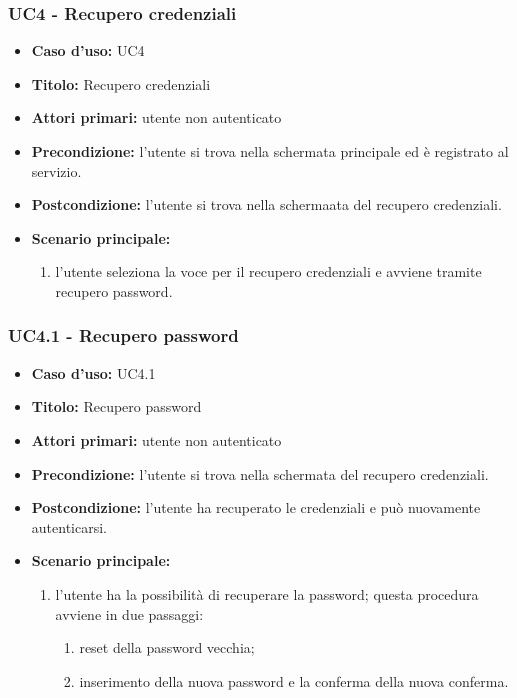 \documentclass[casi-duso]{subfiles}
\begin{document}
\subsubsection{UC4 - Recupero credenziali}
\label{subsub:uc4utente}
\begin{itemize}
  \item \textbf{Caso d’uso:} UC4 
  \item \textbf{Titolo:} Recupero credenziali
  \item \textbf{Attori primari:} utente non autenticato
  \item \textbf{Precondizione:} l'utente si trova nella schermata principale ed è registrato al servizio.
  \item \textbf{Postcondizione:} l'utente si trova nella schermaata del recupero credenziali.
  \item \textbf{Scenario principale:} 
  \begin{enumerate}
    \item l'utente seleziona la voce per il recupero credenziali e avviene tramite recupero password.
  \end{enumerate} 
\end{itemize}

\subsubsection{UC4.1 - Recupero password}
\label{subsub:uc4.1utente}
\begin{itemize}
  \item \textbf{Caso d’uso:} UC4.1 
  \item \textbf{Titolo:} Recupero password
  \item \textbf{Attori primari:} utente non autenticato
  \item \textbf{Precondizione:} l'utente si trova nella schermata del recupero credenziali.
  \item \textbf{Postcondizione:} l'utente ha recuperato le credenziali e può nuovamente autenticarsi.
  \item \textbf{Scenario principale:} 
  \begin{enumerate}
    \item l'utente ha la possibilità di recuperare la password; questa procedura avviene in due passaggi:
    \begin{enumerate}
      \item reset della password vecchia;
      \item inserimento della nuova password e la conferma della nuova conferma.
    \end{enumerate}
  \end{enumerate} 
\end{itemize}
\end{document}
